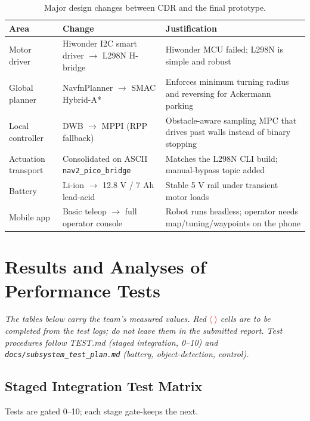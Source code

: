\documentclass[12pt,a4paper]{report}
\newcommand{\fillin}{\textcolor{red}{$\langle\ \rangle$}}
\begin{document}
\begin{table}[H]
\centering
\caption{Major design changes between CDR and the final prototype.}
\label{tab:design_changes}
\begin{tabularx}{\textwidth}{|p{3.2cm}|p{4.4cm}|X|}
\hline
\textbf{Area} & \textbf{Change} & \textbf{Justification} \\
\hline
Motor driver & Hiwonder I2C smart driver $\rightarrow$ L298N H-bridge & Hiwonder MCU failed; L298N is simple and robust \\
\hline
Global planner & NavfnPlanner $\rightarrow$ SMAC Hybrid-A* & Enforces minimum turning radius and reversing for Ackermann parking \\
\hline
Local controller & DWB $\rightarrow$ MPPI (RPP fallback) & Obstacle-aware sampling MPC that drives past walls instead of binary stopping \\
\hline
Actuation transport & Consolidated on ASCII \texttt{nav2\_pico\_bridge} & Matches the L298N CLI build; manual-bypass topic added \\
\hline
Battery & Li-ion $\rightarrow$ 12.8 V / 7 Ah lead-acid & Stable 5 V rail under transient motor loads \\
\hline
Mobile app & Basic teleop $\rightarrow$ full operator console & Robot runs headless; operator needs map/tuning/waypoints on the phone \\
\hline
\end{tabularx}
\end{table}

\chapter{Results and Analyses of Performance Tests}
\label{ch:results}

\noindent\textit{The tables below carry the team's measured values. Red
\fillin{} cells are to be completed from the test logs; do not leave them in the
submitted report. Test procedures follow TEST.md (staged integration, 0--10) and
\texttt{docs/subsystem\_test\_plan.md} (battery, object-detection, control).}

\section{Staged Integration Test Matrix}

Tests are gated 0--10; each stage gate-keeps the next.
\end{document}
